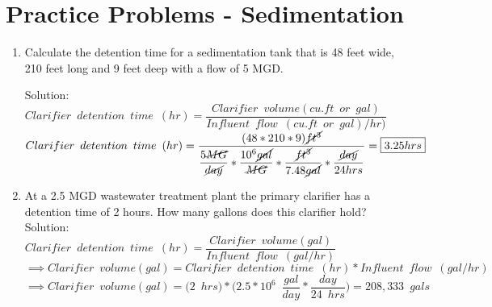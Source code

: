 \section*{Practice Problems - Sedimentation} 

\begin{enumerate}

\item Calculate the detention time for a sedimentation tank that is 48 feet wide, 210 feet long and 9 feet deep with a flow of 5 MGD.\\

\vspace{0.5cm}

Solution: \\
$Clarifier \enspace detention \enspace time \enspace (hr) = 	\dfrac{ Clarifier \enspace volume (cu.ft \enspace or \enspace gal)}{Influent \enspace flow \enspace (cu.ft \enspace or \enspace gal)/hr)}$\\
$Clarifier \enspace detention \enspace time \enspace (hr) = 	\dfrac{(48*210*9)\cancel{ft^3}}{\dfrac{5\cancel{MG}}{\cancel{day}}*\dfrac{10^6\cancel{gal}}{\cancel{MG}}*\dfrac{\cancel{ft^3}}{7.48\cancel{gal}}*\dfrac{\cancel{day}}{24hrs}}=\boxed{3.25hrs}$\\



\item  At a 2.5 MGD wastewater treatment plant the primary clarifier has a detention time of 2 hours. How many gallons does this clarifier hold?\\

\vspace{0.5cm}
Solution:\\
\vspace{0.2cm}
$Clarifier \enspace detention \enspace time \enspace (hr) = 	\dfrac{ Clarifier \enspace volume (gal)}{Influent \enspace flow \enspace (gal/hr)}$\\
\vspace{0.2cm}
$ \implies Clarifier \enspace volume (gal)=Clarifier \enspace detention \enspace time \enspace (hr)*Influent \enspace flow \enspace (gal/hr)$\\
\vspace{0.2cm}
$ \implies Clarifier \enspace volume (gal)= \Big(2 \enspace hrs\Big)*\Big(2.5*10^6 \enspace \dfrac{gal}{day}*\dfrac{day}{24 \enspace hrs}\Big)=\boxed{208,333 \enspace gals}$\\




\end{enumerate}
